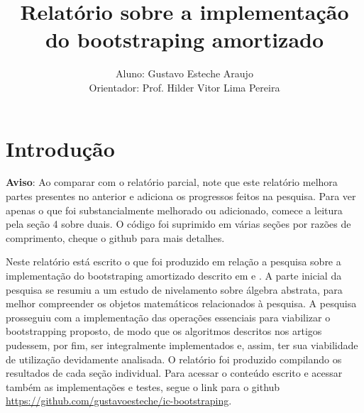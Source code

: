 \documentclass[a4paper,10pt]{article}
\title{Relatório sobre a implementação do bootstraping amortizado}
\author{
    Aluno: Gustavo Esteche Araujo\\
    Orientador: Prof. Hilder Vitor Lima Pereira
}
\date{}
\numberwithin{equation}{section} %
\theoremstyle{definition}
\begin{document}
 

\maketitle

\section{Introdução}
\textbf{Aviso}: Ao comparar com o relatório parcial, note que este relatório melhora partes presentes no anterior e adiciona os progressos feitos na pesquisa. 
Para ver apenas o que foi substancialmente melhorado ou adicionado, comece a leitura pela seção 4 sobre duais. O código foi suprimido em várias seções por razões 
de comprimento, cheque o github para mais detalhes.

Neste relatório está escrito o que foi produzido em relação a pesquisa sobre a implementação do 
bootstraping amortizado descrito em \cite{lw23I} e \cite{lw23II}. A parte inicial da pesquisa se 
resumiu a um estudo de nivelamento sobre álgebra abstrata, para melhor compreender os objetos 
matemáticos relacionados à pesquisa. A pesquisa prosseguiu com a implementação das operações essenciais para 
viabilizar o bootstrapping proposto, de modo que os algoritmos descritos nos artigos pudessem, por fim, ser integralmente 
implementados e, assim, ter sua viabilidade de utilização devidamente analisada. 
O relatório foi produzido 
compilando os resultados de cada seção individual. Para acessar o conteúdo escrito e acessar também as implementações e testes,
segue o link para o github \url{https://github.com/gustavoesteche/ic-bootstraping}.



\newpage



\newpage



\newpage



\newpage



\newpage



\newpage



\newpage



\newpage
\end{document}
